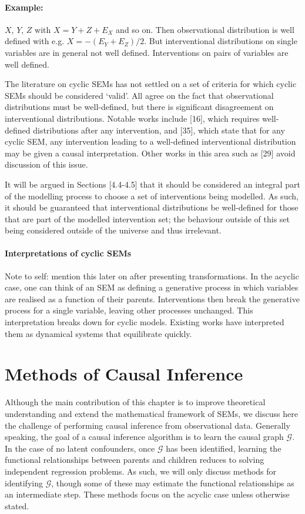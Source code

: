 \paragraph{Example:} $X$, $Y$, $Z$ with $X = Y+Z+ E_X$ and so on. Then observational distribution is well defined with e.g. $X= -(E_Y + E_Z) / 2$. But interventional distributions on single variables are in general not well defined. Interventions on pairs of variables are well defined.

The literature on cyclic SEMs has not settled on a set of criteria for which cyclic SEMs should be considered `valid'. 
All agree on the fact that observational distributions must be well-defined, but there is significant disagreement on interventional distributions.
Notable works include [16], which requires well-defined distributions after any intervention, and [35], which state that for any cyclic SEM, any intervention leading to a well-defined interventional distribution may be given a causal interpretation. Other works in this area such as [29] avoid discussion of this issue.

It will be argued in Sections [4.4-4.5] that it should be considered an integral part of the modelling process to choose a set of interventions being modelled. As such, it should be guaranteed that interventional distributions be well-defined for those that are part of the modelled intervention set; the behaviour outside of this set being considered outside of the universe and thus irrelevant.

\paragraph{Interpretations of cyclic SEMs}
Note to self: mention this later on after presenting transformations.
In the acyclic case, one can think of an SEM as defining a generative process in which variables are realised as a function of their parents. Interventions then break the generative process for a single variable, leaving other processes unchanged.
This interpretation breaks down for cyclic models. Existing works have interpreted them as dynamical systems that equilibrate quickly. 


\section{Methods of Causal Inference}

Although the main contribution of this chapter is to improve theoretical understanding and extend the mathematical framework of SEMs, we discuss here the challenge of performing causal inference from observational data. %
Generally speaking, the goal of a causal inference algorithm is to learn the causal graph $\mathcal{G}$. 
In the case of no latent confounders, once $\mathcal{G}$ has been identified, learning the functional relationships between parents and children reduces to solving independent regression problems. As such, we will only discuss methods for identifying $\mathcal{G}$, though some of these may estimate the functional relationships as an intermediate step.
These methods focus on the acyclic case unless otherwise stated.

